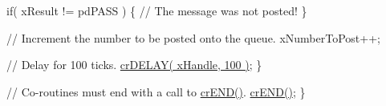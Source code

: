 \begin{DoxyPre}       if( xResult != pdPASS )
       \{
           // The message was not posted!
       \}\end{DoxyPre}



\begin{DoxyPre}       // Increment the number to be posted onto the queue.
       xNumberToPost++;\end{DoxyPre}



\begin{DoxyPre}       // Delay for 100 ticks.
       \hyperlink{croutine_8h_a05a06feb11028f2d1d440ea335f562ba}{crDELAY( xHandle, 100 )};
   \}\end{DoxyPre}



\begin{DoxyPre}   // Co-routines must end with a call to \hyperlink{croutine_8h_ae6038cc976689b50000475ebfc4e2f23}{crEND()}.
   \hyperlink{croutine_8h_ae6038cc976689b50000475ebfc4e2f23}{crEND()};
\}\end{DoxyPre}
 